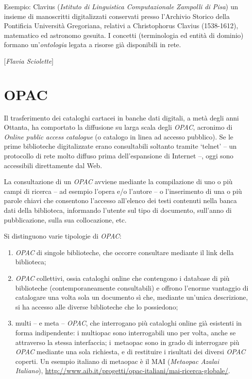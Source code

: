 Esempio: Clavius (\emph{Istituto di Linguistica Computazionale Zampolli
di Pisa}) un insieme di manoscritti digitalizzati conservati presso
l'Archivio Storico della Pontificia Università Gregoriana, relativi a
Christophorus Clavius (1538-1612), matematico ed astronomo gesuita. I
concetti (terminologia ed entità di dominio) formano un'\emph{ontologia}
legata a risorse già disponibili in rete.

\hrulefill 

{[}\emph{Flavia Sciolette}{]}



\chapter{OPAC}

Il trasferimento dei cataloghi cartacei in banche dati digitali, a metà
degli anni Ottanta, ha comportato la diffusione su larga scala degli
\emph{OPAC}, acronimo di \emph{Online public access catalogue} (o
catalogo in linea ad accesso pubblico). Se le prime biblioteche
digitalizzate erano consultabili soltanto tramite `telnet' -- un
protocollo di rete molto diffuso prima dell'espansione di Internet --,
oggi sono accessibili direttamente dal Web.

La consultazione di un \emph{OPAC} avviene mediante la compilazione di
uno o più campi di ricerca -- ad esempio l'opera e/o l'autore -- o
l'inserimento di una o più parole chiavi che consentono l'accesso
all'elenco dei testi contenuti nella banca dati della biblioteca,
informando l'utente sul tipo di documento, sull'anno di pubblicazione,
sulla sua collocazione, etc.

Si distinguono varie tipologie di \emph{OPAC}:

\begin{enumerate}
\def\labelenumi{\arabic{enumi}.}
\item
  \emph{OPAC} di singole biblioteche, che occorre consultare mediante il
  link della biblioteca;
\item
  \emph{OPAC} collettivi, ossia cataloghi online che contengono i
  database di più biblioteche (contemporaneamente consultabili) e
  offrono l'enorme vantaggio di catalogare una volta sola un documento
  sì che, mediante un'unica descrizione, si ha accesso alle diverse
  biblioteche che lo possiedono;
\item
  multi -- e meta -- \emph{OPAC}, che interrogano più cataloghi online
  già esistenti in forma indipendente: i multiopac sono interrogabili
  uno per volta, anche se attraverso la stessa interfaccia; i~metaopac
  sono in grado di interrogare più \emph{OPAC} mediante una sola
  richiesta, e di restituire i risultati dei diversi \emph{OPAC}
  coperti. Un esempio italiano di metaopac è il MAI (\emph{Metaopac
  Azalai Italiano}),
  \url{http://www.aib.it/progetti/opac-italiani/mai-ricerca-globale/}.
\end{enumerate}

